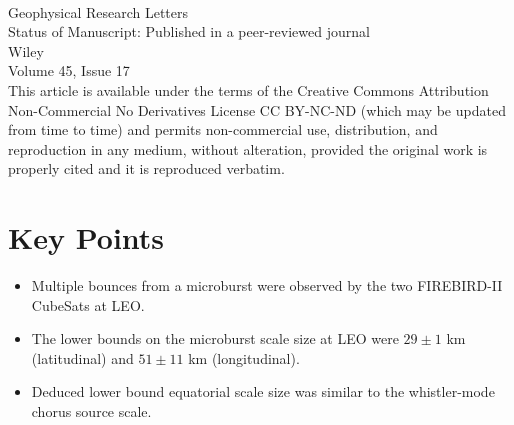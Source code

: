  \\
Geophysical Research Letters \\
Status of Manuscript: Published in a peer-reviewed journal \\
Wiley \\
Volume 45, Issue 17 \\


This article is available under the terms of the Creative Commons Attribution Non-Commercial No Derivatives License CC BY-NC-ND (which may be updated from time to time) and permits non-commercial use, distribution, and reproduction in any medium, without alteration, provided the original work is properly cited and it is reproduced verbatim.

\newpage

\section{Key Points}
\begin{itemize}
\item Multiple bounces from a microburst were observed by the two FIREBIRD-II CubeSats at LEO.
\item The lower bounds on the microburst scale size at LEO were $29 \pm 1$ km (latitudinal) and $51 \pm 11$ km (longitudinal).
\item Deduced lower bound equatorial scale size was similar to the whistler-mode chorus source scale.
\end{itemize}

%
%


